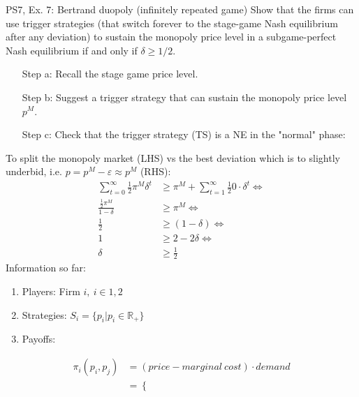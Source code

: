 \begin{frame}{PS7, Ex. 7: Bertrand duopoly (infinitely repeated game)}
    Show that the firms can use trigger strategies (that switch forever to the stage-game Nash equilibrium after any deviation) to sustain the monopoly price level in a subgame-perfect Nash equilibrium if and only if $\delta\geq1/2$.
    \vspace{-6pt}
    \begin{multicols}{2}
      \begin{itemize}
        \item[Step a:] Recall the stage game price level.
        \item[Step b:] Suggest a trigger strategy that can sustain the monopoly price level $p^M$.
        \item[Step c:] Check that the trigger strategy (TS) is a NE in the "normal" phase:
      \end{itemize}
      \vspace{-4pt}
      To split the monopoly market (LHS) vs the best deviation which is to slightly underbid, i.e. $p=p^M-\varepsilon\approx p^M$ (RHS):
      \vspace{-4pt}
      \begin{align*}
        \sum\limits_{t=0}^\infty\frac{1}{2}\pi^M\delta^t&\geq\pi^M+\sum\limits_{t=1}^\infty\frac{1}{2}0\cdot\delta^t\Leftrightarrow\\
        \frac{\frac{1}{2}\pi^M}{1-\delta}&\geq\pi^M\Leftrightarrow\\
        \frac{1}{2}&\geq(1-\delta)\Leftrightarrow\\
        1&\geq2-2\delta\Leftrightarrow\\
        \delta&\geq\frac{1}{2}
      \end{align*}
      \vfill\null\columnbreak
      Information so far:
      \vspace{-4pt}
      \begin{enumerate}
        \item Players: Firm $i,\ i\in1,2$
        \item Strategies: $S_i=\{p_i|p_i\in\mathbb{R}_+\}$
        \item Payoffs:
      \end{enumerate}
      \vspace{-12pt}
      \begin{align*}
        \pi_i(p_i,p_j)&=(price-marginal\ cost)\cdot demand\\
                      &=\left\{\begin{array}{lcl}

\end{array}
\end{align*}
\end{multicols}
\end{frame}
